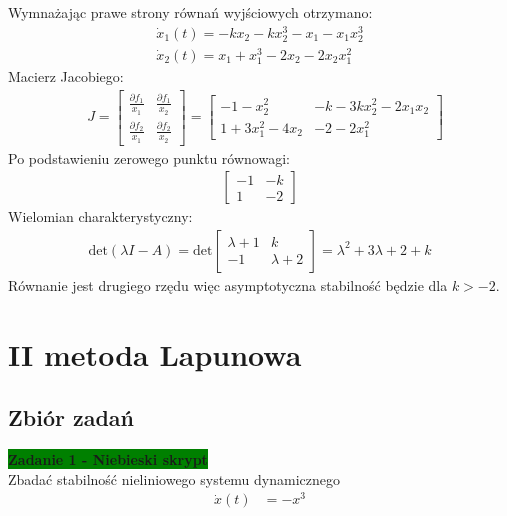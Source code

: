 \documentclass[a4paper,11pt]{article}
\begin{document}
Wymnażając prawe strony równań wyjściowych otrzymano:
\begin{align*}
\dot{x}_1(t)=-kx_2-kx_2^3-x_1-x_1x_2^3 \\
\dot{x}_2(t)=x_1+x_1^3-2x_2-2x_2x_1^2
\end{align*}
Macierz Jacobiego:
\begin{align*}
&J = 
\begin{bmatrix}
\frac{\partial f_1}{x_1} & \frac{\partial f_1}{x_2} \\
\frac{\partial f_2}{x_1} &  \frac{\partial f_2}{x_2}
\end{bmatrix}
=
\begin{bmatrix} 
-1-x_2^2 & -k-3kx_2^2-2x_1x_2 \\
1+3x_1^2-4x_2 & -2-2x_1^2 
\end{bmatrix}
\end{align*}
Po podstawieniu zerowego punktu równowagi:
\begin{align*}
\begin{bmatrix} 
-1 & -k \\
1 & -2 
\end{bmatrix}
\end{align*}
Wielomian charakterystyczny:
\begin{align*}
\text{det}(\lambda I - A ) = 
\text{det}
\begin{bmatrix} 
\lambda +1 & k \\
-1 & \lambda +2 
\end{bmatrix} = 
\lambda ^{2} + 3\lambda + 2 + k
\end{align*}
Równanie jest drugiego rzędu więc asymptotyczna stabilność będzie dla \( k > -2 \). 

\newpage
\section{II metoda Lapunowa}

\subsection{Zbiór zadań}
\begin{framed}
\textbf{\colorbox{green}{Zadanie 1 - Niebieski skrypt} } \\ 
Zbadać stabilność nieliniowego systemu dynamicznego
\begin{align*}
\dot{x}(t)&=-x^{3} \\
\end{align*}
\end{framed}
\end{document}
